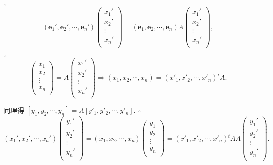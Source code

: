 \documentclass[color=black,device=normal,lang=cn,mode=geye]{elegantnote}
\begin{document}
$\because$
\[(\boldsymbol{e}_1',\boldsymbol{e}_2',\cdots,\boldsymbol{e}_n')\begin{pmatrix}
    x_1' \\
    x_2' \\
    \vdots \\
    x_n' \\
\end{pmatrix}=(\boldsymbol{e}_1,\boldsymbol{e}_2,\cdots,\boldsymbol{e}_n)A\begin{pmatrix}
    x_1' \\
    x_2' \\
    \vdots \\
    x_n' \\
\end{pmatrix},\]

$\therefore$
\[\begin{pmatrix}
    x_1 \\
    x_2 \\
    \vdots \\
    x_n \\
\end{pmatrix}=A\begin{pmatrix}
    x_1' \\
    x_2' \\
    \vdots \\
    x_n' \\
\end{pmatrix}\Rightarrow(x_1,x_2,\cdots,x_n)=(x'_1,x'_2,\cdots,x'_n){}^tA.\]

同理得 $[y_1,y_2,\cdots,y_n]=A[y'_1,y'_2,\cdots,y'_n]$. $\therefore$
\[(x_1',x_2',\cdots,x_n')\begin{pmatrix}
    y_1' \\
    y_2' \\
    \vdots \\
    y_n' \\
\end{pmatrix}=(x_1,x_2,\cdots,x_n)\begin{pmatrix}
    y_1 \\
    y_2 \\
    \vdots \\
    y_n \\
\end{pmatrix}=(x'_1,x'_2,\cdots,x'_n){}^tAA\begin{pmatrix}
    y_1' \\
    y_2' \\
    \vdots \\
    y_n' \\
\end{pmatrix}.\]
\end{document}
